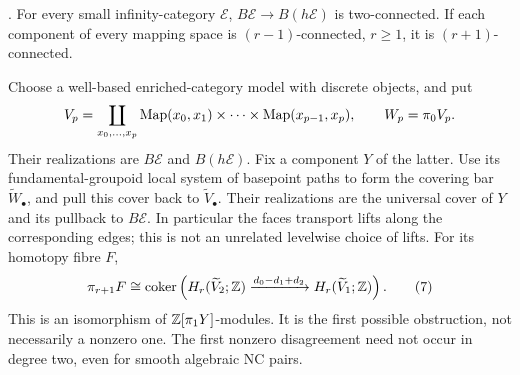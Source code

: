 \begin{theorem}\label{P1d3}
.
For every small infinity-category $\mathcal E$,
$B\mathcal E\to B(h\mathcal E)$ is two-connected.
If each component of every mapping space is
$(r-1)$-connected, $r\ge1$, it is
$(r+1)$-connected.

Choose a well-based enriched-category model
with discrete objects, and put
\[
 V_p=\coprod_{x_0,\ldots,x_p}
       \operatorname{Map}(x_0,x_1)\times\cdots\times\operatorname{Map}(x_{p-1},x_p),
 \qquad W_p=\pi_0V_p .
\]
Their realizations are $B\mathcal E$ and $B(h\mathcal E)$.
Fix a component $Y$ of the latter. Use its fundamental-groupoid
local system of basepoint paths to form the covering bar
$\widetilde W_\bullet$, and pull this cover back to
$\widetilde V_\bullet$. Their realizations are the universal
cover of $Y$ and its pullback to $B\mathcal E$.
In particular the faces transport lifts along the corresponding
edges; this is not an unrelated levelwise choice of lifts.
For its homotopy fibre $F$,
\[
 \pi_{r+1}F\cong
 \operatorname{coker}\left(
 H_r(\widetilde V_2;\mathbb Z)
 \xrightarrow{d_0-d_1+d_2}
 H_r(\widetilde V_1;\mathbb Z)\right) . \tag{7}
\]
This is an isomorphism of $\mathbb Z[\pi_1Y]$-modules.
It is the first possible obstruction, not necessarily
a nonzero one. The first nonzero disagreement need not
occur in degree two, even for smooth algebraic NC pairs.
\end{theorem}
